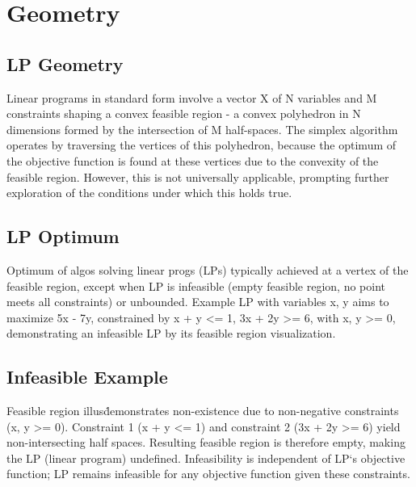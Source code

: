 \section*{Geometry}

\subsection*{LP Geometry}
Linear programs in standard form involve a vector X of N variables and M constraints shaping a convex feasible region - a convex polyhedron in N dimensions formed by the intersection of M half-spaces.
The simplex algorithm operates by traversing the vertices of this polyhedron, because the optimum of the objective function is found at these vertices due to the convexity of the feasible region.
However, this is not universally applicable, prompting further exploration of the conditions under which this holds true.

\subsection*{LP Optimum}
Optimum of algos solving linear progs (LPs) typically achieved at a vertex of the feasible region, except when LP is infeasible (empty feasible region, no point meets all constraints) or unbounded.
Example LP with variables x, y aims to maximize 5x - 7y, constrained by x + y \textless{}= 1, 3x + 2y \textgreater{}= 6, with x, y \textgreater{}= 0, demonstrating an infeasible LP by its feasible region visualization.

\subsection*{Infeasible Example}
Feasible region illus\. demonstrates non-existence due to non-negative constraints (x, y \textgreater{}= 0).
Constraint 1 (x + y \textless{}= 1) and constraint 2 (3x + 2y \textgreater{}= 6) yield non-intersecting half spaces.
Resulting feasible region is therefore empty, making the LP (linear program) undefined.
Infeasibility is independent of LP`s objective function; LP remains infeasible for any objective function given these constraints.

